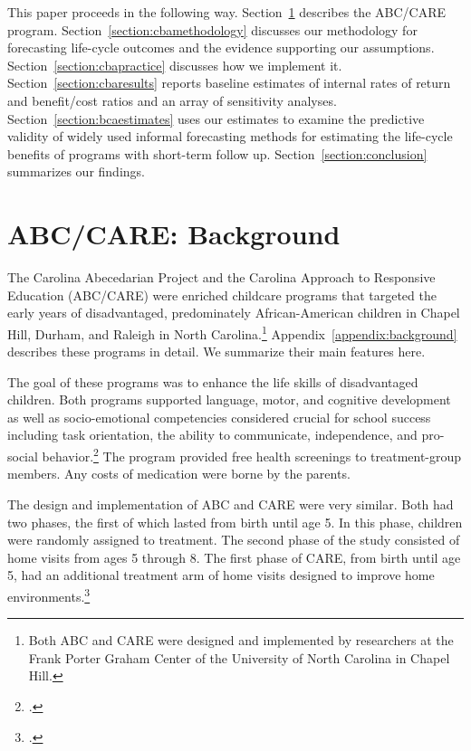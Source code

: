 This paper proceeds in the following way. Section~\ref{section:background} describes the ABC/CARE program. Section~\ref{section:cbamethodology} discusses our methodology for forecasting life-cycle outcomes and the evidence supporting our assumptions. Section~\ref{section:cbapractice} discusses how we implement it. Section~\ref{section:cbaresults} reports baseline estimates of internal rates of return and benefit/cost ratios and an array of sensitivity analyses. Section~\ref{section:bcaestimates} uses our estimates to examine the predictive validity of widely used informal forecasting methods for estimating the life-cycle benefits of programs with short-term follow up. Section~\ref{section:conclusion} summarizes our findings.

\section{ABC/CARE: Background} \label{section:background}

The Carolina Abecedarian Project and the Carolina Approach to Responsive Education (ABC/CARE) were enriched childcare programs that targeted the early years of disadvantaged, predominately African-American children in Chapel Hill, Durham, and Raleigh in North Carolina.\footnote{Both ABC and CARE were designed and implemented by researchers at the Frank Porter Graham Center of the University of North Carolina in Chapel Hill.} Appendix~\ref{appendix:background} describes these programs in detail. We summarize their main features here.

The goal of these programs was to enhance the life skills of disadvantaged children. Both programs supported language, motor, and cognitive development as well as socio-emotional competencies considered crucial for school success including task orientation, the ability to communicate, independence, and pro-social behavior.\footnote{\citet{Sparling_1974_Synth_Edu_Infant_SPEECH, Ramey_Collier_etal_1976_CarolinaAbecedarianProject, Ramey_etal_1985_Project-CARE_TiECSE, Wasik_Ramey_etal_1990_CD, Ramey-etal_2012-ABC}.} The program provided free health screenings to treatment-group members. Any costs of medication were borne by the parents.

The design and implementation of ABC and CARE were very similar. Both had two phases, the first of which lasted from birth until age 5. In this phase, children were randomly assigned to treatment. The second phase of the study consisted of home visits from ages 5 through 8. The first phase of CARE, from birth until age 5, had an additional treatment arm of home visits designed to improve home environments.\footnote{\citet{Wasik_Ramey_etal_1990_CD}.}

